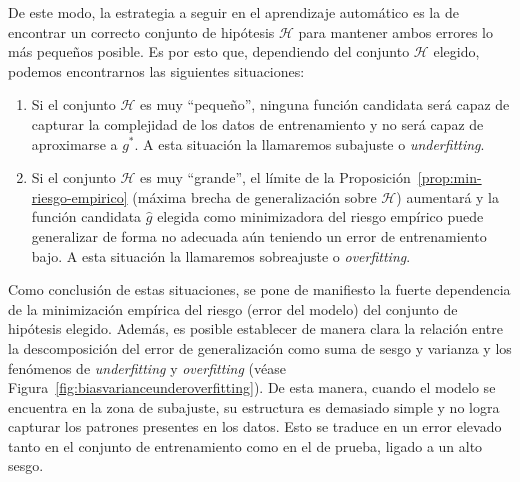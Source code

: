 De este modo, la estrategia a seguir en el aprendizaje automático es la de encontrar un correcto conjunto de hipótesis $\mathcal{H}$ para mantener ambos errores lo más pequeños posible. Es por esto que, dependiendo del conjunto $\mathcal{H}$ elegido, podemos encontrarnos las siguientes situaciones:

\begin{enumerate}
    \item Si el conjunto $\mathcal{H}$ es muy ``pequeño'', ninguna función candidata será capaz de capturar la complejidad de los datos de entrenamiento y no será capaz de aproximarse a $g^{*}$. A esta situación la llamaremos subajuste o \emph{underfitting}.
    \item Si el conjunto $\mathcal{H}$ es muy ``grande'', el límite de la Proposición~\ref{prop:min-riesgo-empirico} (máxima brecha de generalización sobre $\mathcal{H}$) aumentará y la función candidata $\hat{g}$ elegida como minimizadora del riesgo empírico puede generalizar de forma no adecuada aún teniendo un error de entrenamiento bajo. A esta situación la llamaremos sobreajuste o \emph{overfitting}.
\end{enumerate}

Como conclusión de estas situaciones, se pone de manifiesto la fuerte dependencia de la minimización empírica del riesgo (error del modelo) del conjunto de hipótesis elegido. Además, es posible establecer de manera clara la relación entre la descomposición del error de generalización como suma de sesgo y varianza y los fenómenos de \emph{underfitting} y \emph{overfitting} (véase Figura~\ref{fig:biasvarianceunderoverfitting}). De esta manera, cuando el modelo se encuentra en la zona de subajuste, su estructura es demasiado simple y no logra capturar los patrones presentes en los datos. Esto se traduce en un error elevado tanto en el conjunto de entrenamiento como en el de prueba, ligado a un alto sesgo.\newline

